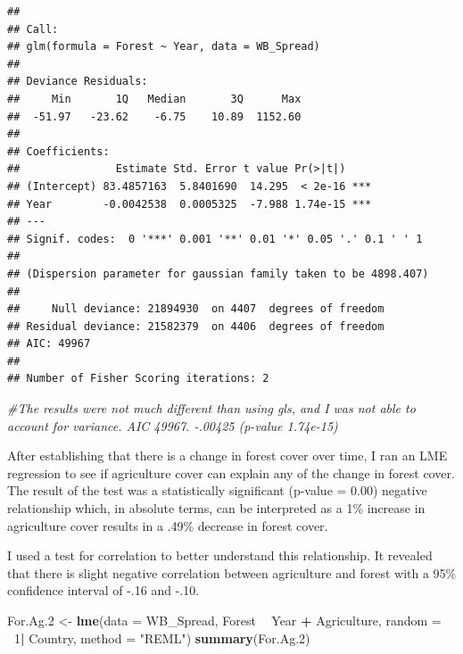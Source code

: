 \documentclass[12pt,]{article}
\newenvironment{Shaded}{\begin{snugshade}}{\end{snugshade}}
\newcommand{\KeywordTok}[1]{\textcolor[rgb]{0.13,0.29,0.53}{\textbf{#1}}}
\newcommand{\DataTypeTok}[1]{\textcolor[rgb]{0.13,0.29,0.53}{#1}}
\newcommand{\DecValTok}[1]{\textcolor[rgb]{0.00,0.00,0.81}{#1}}
\newcommand{\StringTok}[1]{\textcolor[rgb]{0.31,0.60,0.02}{#1}}
\newcommand{\CommentTok}[1]{\textcolor[rgb]{0.56,0.35,0.01}{\textit{#1}}}
\newcommand{\OperatorTok}[1]{\textcolor[rgb]{0.81,0.36,0.00}{\textbf{#1}}}
\newcommand{\NormalTok}[1]{#1}
\begin{document}
\begin{verbatim}
## 
## Call:
## glm(formula = Forest ~ Year, data = WB_Spread)
## 
## Deviance Residuals: 
##     Min       1Q   Median       3Q      Max  
##  -51.97   -23.62    -6.75    10.89  1152.60  
## 
## Coefficients:
##               Estimate Std. Error t value Pr(>|t|)    
## (Intercept) 83.4857163  5.8401690  14.295  < 2e-16 ***
## Year        -0.0042538  0.0005325  -7.988 1.74e-15 ***
## ---
## Signif. codes:  0 '***' 0.001 '**' 0.01 '*' 0.05 '.' 0.1 ' ' 1
## 
## (Dispersion parameter for gaussian family taken to be 4898.407)
## 
##     Null deviance: 21894930  on 4407  degrees of freedom
## Residual deviance: 21582379  on 4406  degrees of freedom
## AIC: 49967
## 
## Number of Fisher Scoring iterations: 2
\end{verbatim}

\begin{Shaded}
\begin{Highlighting}[]
\CommentTok{#The results were not much different than using gls, and I was not able to account for variance. AIC 49967. -.00425 (p-value 1.74e-15)}
\end{Highlighting}
\end{Shaded}

After establishing that there is a change in forest cover over time, I
ran an LME regression to see if agriculture cover can explain any of the
change in forest cover. The result of the test was a statistically
significant (p-value = 0.00) negative relationship which, in absolute
terms, can be interpreted as a 1\% increase in agriculture cover results
in a .49\% decrease in forest cover.

I used a test for correlation to better understand this relationship. It
revealed that there is slight negative correlation between agriculture
and forest with a 95\% confidence interval of -.16 and -.10.

\begin{Shaded}
\begin{Highlighting}[]
\NormalTok{For.Ag.}\DecValTok{2}\NormalTok{ <-}\StringTok{  }\KeywordTok{lme}\NormalTok{(}\DataTypeTok{data =}\NormalTok{ WB_Spread,}
\NormalTok{              Forest }\OperatorTok{~}\StringTok{ }\NormalTok{Year }\OperatorTok{+}\StringTok{ }\NormalTok{Agriculture,}
              \DataTypeTok{random =} \OperatorTok{~}\DecValTok{1}\OperatorTok{|}\StringTok{ }\NormalTok{Country,}
              \DataTypeTok{method =} \StringTok{"REML"}\NormalTok{)}
\KeywordTok{summary}\NormalTok{(For.Ag.}\DecValTok{2}\NormalTok{)}
\end{Highlighting}
\end{Shaded}
\end{document}
